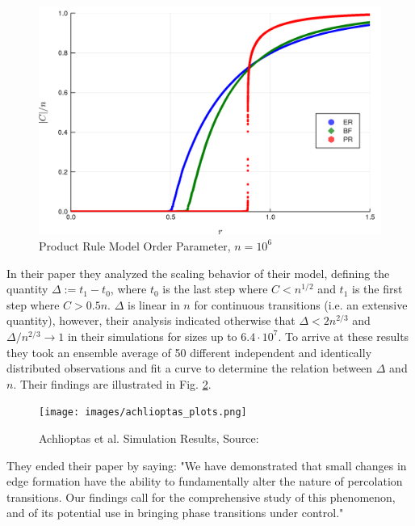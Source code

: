\begin{figure}[H]
	\centering
	\includegraphics[width=350pt]{images/ER_BF_PR_1e6_order_param.png}
	\caption{Product Rule Model Order Parameter, $n = 10^6$}
	\label{fig:ER_BF_PR_transition}
\end{figure}

In their paper they analyzed the scaling behavior of their model, defining the quantity $\Delta := t_1 - t_0$, where $t_0$ is the last step where $C < n^{1/2}$ and $t_1$ is the first step where $C > 0.5n$.
$\Delta$ is linear in $n$ for continuous transitions (i.e. an extensive quantity), however, their analysis indicated otherwise that $\Delta < 2n^{2/3}$ and $\Delta / n^{2/3} \rightarrow 1$ in their simulations for sizes up to $6.4 \cdot 10^7$.
To arrive at these results they took an ensemble average of 50 different independent and identically distributed observations and fit a curve to determine the relation between $\Delta$ and $n$.
Their findings are illustrated in Fig. \ref{fig:achlioptas_plots}.
\cite{Achlioptas_1}

\begin{figure}[H]
	\centering
	\texttt{[image: images/achlioptas\_plots.png]}
	\caption{Achlioptas et al. Simulation Results, Source: \cite{Achlioptas_1}}
	\label{fig:achlioptas_plots}
\end{figure}

They ended their paper by saying: "We have demonstrated that small changes in edge formation have the ability to fundamentally alter the nature of percolation transitions. Our findings call for the comprehensive study of this phenomenon, and of its potential use in bringing phase transitions under control." \cite{Achlioptas_1}



